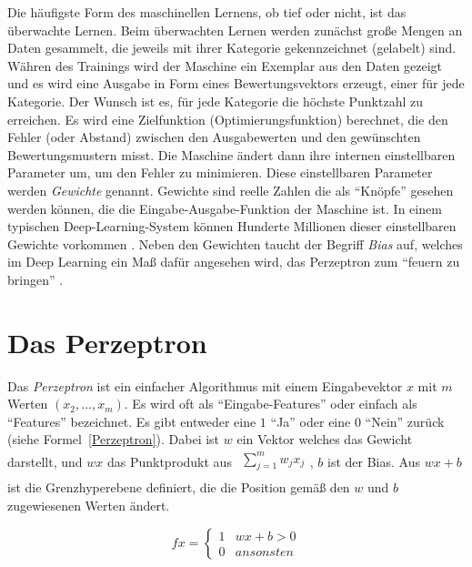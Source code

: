 Die häufigste Form des maschinellen Lernens, ob tief oder nicht, ist das überwachte Lernen. Beim überwachten Lernen werden zunächst große Mengen an Daten gesammelt, die jeweils mit ihrer Kategorie gekennzeichnet (gelabelt) sind. Währen des Trainings wird der Maschine ein Exemplar aus den Daten gezeigt und es wird eine Ausgabe in Form eines Bewertungsvektors erzeugt, einer für jede Kategorie. Der Wunsch ist es, für jede Kategorie die höchste Punktzahl zu erreichen. Es wird eine Zielfunktion (Optimierungsfunktion) berechnet, die den Fehler (oder Abstand) zwischen den Ausgabewerten und den gewünschten Bewertungsmustern misst. Die Maschine ändert dann ihre internen einstellbaren Parameter um, um den Fehler zu minimieren. Diese einstellbaren Parameter werden \textit{Gewichte} genannt. Gewichte sind reelle Zahlen die als \enquote{Knöpfe} gesehen werden können, die die Eingabe-Ausgabe-Funktion der Maschine ist. In einem typischen Deep-Learning-System können Hunderte Millionen dieser einstellbaren Gewichte vorkommen \cite*{Lecun2015}. Neben den Gewichten taucht der Begriff \textit{Bias} auf, welches im Deep Learning ein Maß dafür angesehen wird, das Perzeptron zum \enquote{feuern zu bringen} \cite*[7]{Nielsen2015}.


\section{Das Perzeptron}
Das \textit{Perzeptron} ist ein einfacher Algorithmus mit einem Eingabevektor $x$ mit $m$ Werten $(x_2, ..., x_m)$. Es wird oft als \enquote{Eingabe-Features} oder einfach als \enquote{Features} bezeichnet. Es gibt entweder eine $1$ \enquote{Ja} oder eine $0$ \enquote{Nein} zurück (siehe Formel~\ref{Perzeptron}). Dabei ist $w$ ein Vektor welches das Gewicht darstellt, und $wx$ das Punktprodukt aus $\begin{array}{l}
        {\textstyle \sum ^{m}_{j=1}} w_{j} x_{j} \\
    \end{array}$, $b$ ist der Bias. Aus $wx + b$ ist die Grenzhyperebene definiert, die die Position gemäß den $w$ und $b$ zugewiesenen Werten ändert.

\begin{equation}\label{Perzeptron}
    fx=\begin{cases}
        1 & wx+b >0   \\
        0 & ansonsten
    \end{cases}
\end{equation}

